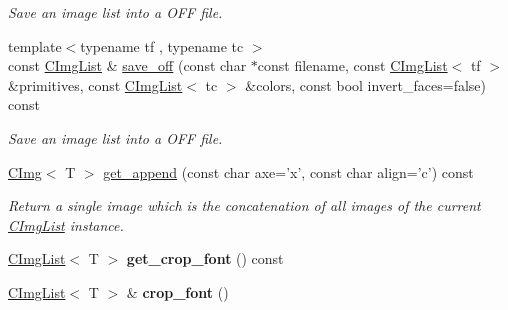 \begin{DoxyCompactItemize}
\begin{DoxyCompactList}\small\item\em Save an image list into a OFF file. \item\end{DoxyCompactList}\item 
\hypertarget{structcimg__library_1_1_c_img_list_a99fb7ff0b9351e899f8c416bd27240d1}{
{\footnotesize template$<$typename tf , typename tc $>$ }\\const \hyperlink{structcimg__library_1_1_c_img_list}{CImgList} \& \hyperlink{structcimg__library_1_1_c_img_list_a99fb7ff0b9351e899f8c416bd27240d1}{save\_\-off} (const char $\ast$const filename, const \hyperlink{structcimg__library_1_1_c_img_list}{CImgList}$<$ tf $>$ \&primitives, const \hyperlink{structcimg__library_1_1_c_img_list}{CImgList}$<$ tc $>$ \&colors, const bool invert\_\-faces=false) const }
\label{structcimg__library_1_1_c_img_list_a99fb7ff0b9351e899f8c416bd27240d1}

\begin{DoxyCompactList}\small\item\em Save an image list into a OFF file. \item\end{DoxyCompactList}\item 
\hyperlink{structcimg__library_1_1_c_img}{CImg}$<$ T $>$ \hyperlink{structcimg__library_1_1_c_img_list_a2e328f768b98559b1d2b9706b1839b31}{get\_\-append} (const char axe='x', const char align='c') const 
\begin{DoxyCompactList}\small\item\em Return a single image which is the concatenation of all images of the current \hyperlink{structcimg__library_1_1_c_img_list}{CImgList} instance. \item\end{DoxyCompactList}\item 
\hypertarget{structcimg__library_1_1_c_img_list_a1431d38fb41eecbe1a49eb68cdf13037}{
\hyperlink{structcimg__library_1_1_c_img_list}{CImgList}$<$ T $>$ {\bfseries get\_\-crop\_\-font} () const }
\label{structcimg__library_1_1_c_img_list_a1431d38fb41eecbe1a49eb68cdf13037}

\item 
\hypertarget{structcimg__library_1_1_c_img_list_a05b1aea104e9ab6639f4d164f6139f34}{
\hyperlink{structcimg__library_1_1_c_img_list}{CImgList}$<$ T $>$ \& {\bfseries crop\_\-font} ()}
\label{structcimg__library_1_1_c_img_list_a05b1aea104e9ab6639f4d164f6139f34}


\end{DoxyCompactItemize}
